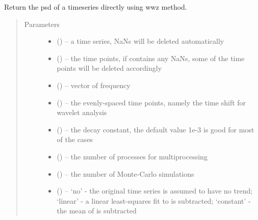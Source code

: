 \documentclass[letterpaper,10pt,english]{sphinxmanual}
\begin{document}
\begin{fulllineitems}
\label{\detokenize{Spectral:pyleoclim.Spectral.wwz_psd}}
Return the psd of a timeseries directly using wwz method.
\begin{quote}\begin{description}
\item[{Parameters}] \leavevmode\begin{itemize}
\item {} 
 () -- a time series, NaNs will be deleted automatically

\item {} 
 () -- the time points, if  contains any NaNs, some of the time points will be deleted accordingly

\item {} 
 () -- vector of frequency

\item {} 
 () -- the evenly-spaced time points, namely the time shift for wavelet analysis

\item {} 
 () -- the decay constant, the default value 1e-3 is good for most of the cases

\item {} 
 () -- the number of processes for multiprocessing

\item {} 
 () -- the number of Monte-Carlo simulations

\item {} 
 () -- `no' - the original time series is assumed to have no trend;
`linear' - a linear least-squares fit to  is subtracted;
`constant' - the mean of  is subtracted


\end{itemize}
\end{description}
\end{quote}
\end{fulllineitems}
\end{document}
